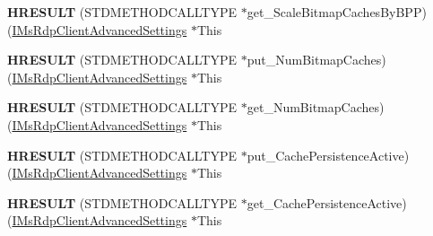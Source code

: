 \begin{DoxyCompactItemize}
\item 
\mbox{\label{struct_m_s_t_s_c_lib_1_1_i_ms_rdp_client_advanced_settings_vtbl_ab664f9a9563acfeba8090b94929e4000}} 
{\bfseries H\+R\+E\+S\+U\+LT} (S\+T\+D\+M\+E\+T\+H\+O\+D\+C\+A\+L\+L\+T\+Y\+PE $\ast$get\+\_\+\+Scale\+Bitmap\+Caches\+By\+B\+PP)(\hyperlink{interface_m_s_t_s_c_lib_1_1_i_ms_rdp_client_advanced_settings}{I\+Ms\+Rdp\+Client\+Advanced\+Settings} $\ast$This
\item 
\mbox{\label{struct_m_s_t_s_c_lib_1_1_i_ms_rdp_client_advanced_settings_vtbl_a909c49c281ef2b7963b59b85371ac88b}} 
{\bfseries H\+R\+E\+S\+U\+LT} (S\+T\+D\+M\+E\+T\+H\+O\+D\+C\+A\+L\+L\+T\+Y\+PE $\ast$put\+\_\+\+Num\+Bitmap\+Caches)(\hyperlink{interface_m_s_t_s_c_lib_1_1_i_ms_rdp_client_advanced_settings}{I\+Ms\+Rdp\+Client\+Advanced\+Settings} $\ast$This
\item 
\mbox{\label{struct_m_s_t_s_c_lib_1_1_i_ms_rdp_client_advanced_settings_vtbl_a2cb0a5ee21960caf785638193c6850eb}} 
{\bfseries H\+R\+E\+S\+U\+LT} (S\+T\+D\+M\+E\+T\+H\+O\+D\+C\+A\+L\+L\+T\+Y\+PE $\ast$get\+\_\+\+Num\+Bitmap\+Caches)(\hyperlink{interface_m_s_t_s_c_lib_1_1_i_ms_rdp_client_advanced_settings}{I\+Ms\+Rdp\+Client\+Advanced\+Settings} $\ast$This
\item 
\mbox{\label{struct_m_s_t_s_c_lib_1_1_i_ms_rdp_client_advanced_settings_vtbl_ae1e7f248d7d51bbf09899ce75aaeea97}} 
{\bfseries H\+R\+E\+S\+U\+LT} (S\+T\+D\+M\+E\+T\+H\+O\+D\+C\+A\+L\+L\+T\+Y\+PE $\ast$put\+\_\+\+Cache\+Persistence\+Active)(\hyperlink{interface_m_s_t_s_c_lib_1_1_i_ms_rdp_client_advanced_settings}{I\+Ms\+Rdp\+Client\+Advanced\+Settings} $\ast$This
\item 
\mbox{\label{struct_m_s_t_s_c_lib_1_1_i_ms_rdp_client_advanced_settings_vtbl_aa2fc8103b3c2f854afefa9f7122bed1d}} 
{\bfseries H\+R\+E\+S\+U\+LT} (S\+T\+D\+M\+E\+T\+H\+O\+D\+C\+A\+L\+L\+T\+Y\+PE $\ast$get\+\_\+\+Cache\+Persistence\+Active)(\hyperlink{interface_m_s_t_s_c_lib_1_1_i_ms_rdp_client_advanced_settings}{I\+Ms\+Rdp\+Client\+Advanced\+Settings} $\ast$This
\item 

\end{DoxyCompactItemize}
